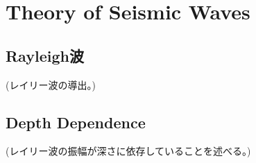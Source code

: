 
\chapter{Theory of Seismic Waves}




\section{Rayleigh波} %
(レイリー波の導出。)

\section{Depth Dependence}
(レイリー波の振幅が深さに依存していることを述べる。)
